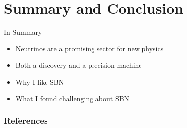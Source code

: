\documentclass{beamer}
\begin{document}
\section{Summary and Conclusion}
\begin{frame}{In Summary}
    \begin{itemize}
        \item Neutrinos are a promising sector for new physics
        \vspace{0.5cm}
        \item Both a discovery and a precision machine
        \vspace{0.5 cm}
        \item Why I like SBN
        \vspace{0.5 cm}
        \item What I found challenging about SBN
    \end{itemize}
    
\end{frame}

\begin{frame}[t, allowframebreaks]
\frametitle{References}
    \printbibliography
\end{frame}
\end{document}
